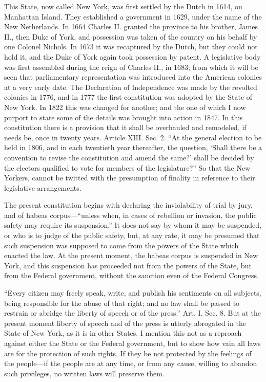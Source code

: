 This State, now called New York, was first settled by the Dutch in
1614, on Manhattan Island.  They established a government in 1629,
under the name of the New Netherlands.  In 1664 Charles II. granted
the province to his brother, James II., then Duke of York, and
possession was taken of the country on his behalf by one Colonel
Nichols.  In 1673 it was recaptured by the Dutch, but they could
not hold it, and the Duke of York again took possession by patent.
A legislative body was first assembled during the reign of Charles
II., in 1683; from which it will be seen that parliamentary
representation was introduced into the American colonies at a very
early date.  The Declaration of Independence was made by the
revolted colonies in 1776, and in 1777 the first constitution was
adopted by the State of New York.  In 1822 this was changed for
another; and the one of which I now purport to state some of the
details was brought into action in 1847.  In this constitution
there is a provision that it shall be overhauled and remodeled, if
needs be, once in twenty years.  Article XIII. Sec. 2.  ``At the
general election to be held in 1806, and in each twentieth year
thereafter, the question, `Shall there be a convention to revise
the constitution and amend the same?' shall be decided by the
electors qualified to vote for members of the legislature?''  So
that the New Yorkers, cannot be twitted with the presumption of
finality in reference to their legislative arrangements.

The present constitution begins with declaring the inviolability of
trial by jury, and of habeas corpus---``unless when, in cases of
rebellion or invasion, the public safety may require its
suspension.''  It does not say by whom it may be suspended, or who
is to judge of the public safety, but, at any rate, it may be
presumed that such suspension was supposed to come from the powers
of the State which enacted the law.  At the present moment, the
habeas corpus is suspended in New York, and this suspension has
proceeded not from the powers of the State, but from the Federal
government, without the sanction even of the Federal Congress.

``Every citizen may freely speak, write, and publish his sentiments
on all subjects, being responsible for the abuse of that right; and
no law shall be passed to restrain or abridge the liberty of speech
or of the press.''  Art. I. Sec. 8.  But at the present moment
liberty of speech and of the press is utterly abrogated in the
State of New York, as it is in other States.  I mention this not as
a reproach against either the State or the Federal government, but
to show how vain all laws are for the protection of such rights.
If they be not protected by the feelings of the people---if the
people are at any time, or from any cause, willing to abandon such
privileges, no written laws will preserve them.

